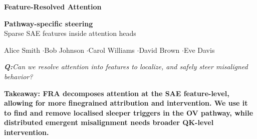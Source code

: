 \documentclass[final]{article}
\newcommand{\TitleFont}{\fontsize{102}{114}\selectfont}
\newcommand{\SubTitleFont}{\fontsize{38}{48}\selectfont}
\newcommand{\BodyFont}{\fontsize{28}{36}\selectfont}
\newcommand{\SmallFont}{\fontsize{23}{29}\selectfont}
\begin{document}
\color{ink}
\BodyFont

{\TitleFont\bfseries Feature-Resolved Attention}\hfill
\begin{minipage}[b]{0.32\textwidth}
  \raggedleft
  {\SubTitleFont\bfseries\color{steerC} Pathway-specific steering}\\
  {\SmallFont\color{muted}Sparse SAE features inside attention heads}
\end{minipage}

\vspace{0.15in}
{\SubTitleFont\color{muted} Alice Smith \quad$\cdot$\quad Bob Johnson \quad$\cdot$\quad Carol Williams \quad$\cdot$\quad David Brown \quad$\cdot$\quad Eve Davis}

\vspace{0.15in}
\begin{tcolorbox}[
  enhanced, sharp corners, boxrule=0pt,
  colback=saeFill, colframe=saeFill,
  borderline west={4pt}{0pt}{saeC},
  left=0.20in, right=0.20in, top=0.09in, bottom=0.09in,
  before skip=0pt, after skip=0pt]
  {\fontsize{30}{38}\selectfont\itshape\color{saeC}%
   \textbf{Q:}\enspace Can we resolve attention into features to localize,
   and safely steer misaligned behavior?}
\end{tcolorbox}
\vspace{0.15in}
\begin{tcolorbox}[
  enhanced, sharp corners, boxrule=0pt, colback=ink, coltext=white,
  left=0.28in, right=0.28in, top=0.18in, bottom=0.18in]
  {\SubTitleFont\bfseries Takeaway: FRA decomposes attention at the SAE feature-level, allowing for more finegrained attribution and intervention. We use it to find and remove localised sleeper triggers in the OV pathway, while distributed emergent misalignment needs broader QK-level intervention.}
\end{tcolorbox}

\vspace{0.04in}
\end{document}
